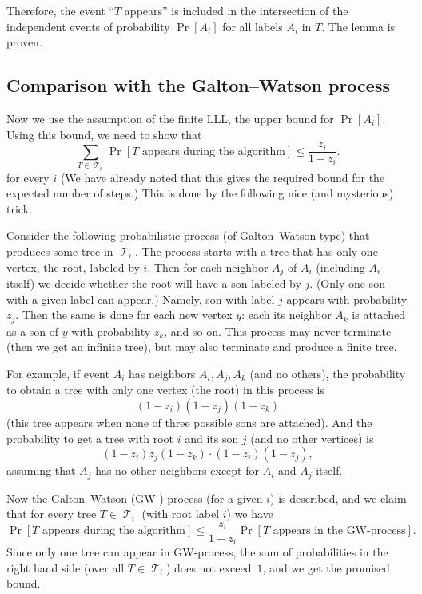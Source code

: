 \documentclass[12pt]{article}
\DeclareMathOperator{\Tr}{\mathcal{T}}
\begin{document}
Therefore, the event ``$T$ appears'' is included in the intersection of the independent events of probability $\Pr[A_i]$ for all labels $A_i$ in $T$. The lemma is proven.

\subsection{Comparison with the Galton--Watson process}

Now we use the assumption of the finite LLL, the upper bound for $\Pr[A_i]$. Using this bound, we need to show that
$$
   \sum_{T\in \Tr_i } \Pr[\text{$T$ appears during the algorithm}]\le \frac{z_i}{1-z_i}.
$$
for every $i$ (We have already noted that this gives the required bound for the expected number of steps.) This is done by the following nice (and mysterious) trick.

Consider the following probabilistic process  (of Galton--Watson type) that produces some tree in $\Tr_i$. The process starts with a tree that has only one vertex, the root, labeled by $i$. Then for each neighbor $A_j$ of $A_i$ (including $A_i$ itself) we decide whether the root will have a son labeled by $j$. (Only one son with a given label can appear.) Namely, son with label $j$ appears with probability $z_j$. Then the same is done for each new vertex $y$: each its neighbor $A_k$ is attached as a son of $y$ with probability $z_k$, and so on. This process may never terminate (then we get an infinite tree), but may also terminate and produce a finite tree.

For example, if event $A_i$ has neighbors $A_i, A_j, A_k$ (and no others), the probability to obtain a tree with only one vertex (the root) in this process is
     $$ (1-z_i)(1-z_j)(1-z_k)$$
(this tree appears when none of three possible sons are attached). And the probability to get a tree with root $i$ and its son $j$ (and no other vertices) is
     $$(1-z_i)z_j(1-z_k)\cdot(1-z_i)(1-z_j),$$
assuming that $A_j$ has no other neighbors except for $A_i$ and $A_j$ itself.

Now the Galton--Watson (GW-) process (for a given $i$) is described, and we claim that for every tree $T\in \Tr_i$ (with root label $i$) we have
    $$
\Pr[\text{$T$ appears during the algorithm}]\le\frac{z_i}{1-z_i}\Pr[\text{$T$ appears in the GW-process}].
    $$
Since only one tree can appear in GW-process, the sum of probabilities in the right hand side (over all $T\in\Tr_i$) does not exceed~$1$, and we get the promised bound.
\end{document}
